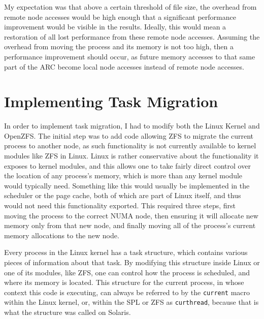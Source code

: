 My expectation was that above a certain threshold of file size, 
the overhead from remote node accesses would be high enough that a significant performance improvement
would be visible in the results.
Ideally, this would mean a restoration of all lost performance from these remote node accesses.
Assuming the overhead from moving the process and its memory is not too high,
then a performance improvement should occur, as future memory accesses to that same part of the ARC become local node
accesses instead of remote node accesses.

\section{Implementing Task Migration}
In order to implement task migration, I had to modify both the Linux Kernel and OpenZFS.
The initial step was to add code allowing ZFS to migrate the current process to another node, 
as such functionality is not currently available to kernel modules like ZFS in Linux.
Linux is rather conservative about the functionality it exposes to kernel modules,
and this allows one to take fairly direct control over the location of any process's memory,
which is more than any kernel module would typically need.
Something like this would usually be implemented in the scheduler or the page cache,
both of which are part of Linux itself, and thus would not need this functionality exported.
This required three steps, first moving the process to the correct NUMA node, then ensuring it will allocate new memory
only from that new node, and finally moving all of the process's current memory
allocations to the new node.

Every process in the Linux kernel has a task structure, which contains various pieces of information about that task.
By modifying this structure inside Linux or one of its modules, like ZFS, 
one can control how the process is scheduled, and where its memory is located.
This structure for the current process, in whose context this code is executing, 
can always be referred to by the \texttt{current} macro within the Linux kernel, or, 
within the SPL or ZFS as \texttt{curthread}, because that is what the structure was called on Solaris.

